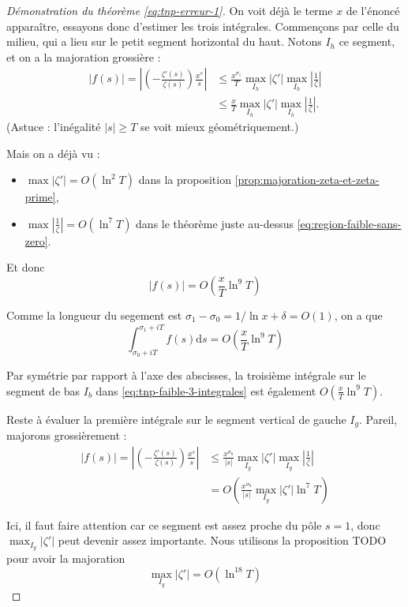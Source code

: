\documentclass[french]{report}
\begin{document}
\begin{proof}[Démonstration du théorème \ref{eq:tnp-erreur-1}]
  On voit déjà le terme $x$ de l'énoncé apparaître, essayons donc d'estimer les trois intégrales. Commençons par celle du milieu, qui a lieu sur le petit segment horizontal du haut. Notons $I_h$ ce segment, et on a la majoration grossière :
  \begin{align*}
    |f(s)| = \left|\left(-\frac{\zeta'(s)}{\zeta(s)}\right)\frac{x^s}{s}\right| & \leq\frac{x^{\sigma_1}}{T}\max_{I_h}|\zeta'|\max_{I_h}\left|\frac{1}{\zeta}\right| \\
    & \leq\frac{x}{T}\max_{I_h}|\zeta'|\max_{I_h}\left|\frac{1}{\zeta}\right|.
  \end{align*}
  (Astuce : l'inégalité $|s|\geq T$ se voit mieux géométriquement.)

  Mais on a déjà vu :
  \begin{itemize}
    \item $\max|\zeta'| = O(\ln^2 T)$ dans la proposition \ref{prop:majoration-zeta-et-zeta-prime},
    \item $\max|\frac{1}{\zeta}| = O(\ln^7 T)$ dans le théorème juste au-dessus \ref{eq:region-faible-sans-zero}.
  \end{itemize}

  Et donc
  \[ |f(s)| = O\left(\frac{x}{T}\ln^9T\right) \]

  Comme la longueur du segement est $\sigma_1-\sigma_0=1/\ln x+\delta=O(1)$, on a que
  \begin{equation}\label{eq:tnp-faible-3-integrales-part1}
    \int_{\sigma_0+iT}^{\sigma_1+iT}f(s)\mathrm{d}s = O\left(\frac{x}{T}\ln^9T\right)
  \end{equation}

  Par symétrie par rapport à l'axe des abscisses, la troisième intégrale sur le segment de bas $I_b$ dans \ref{eq:tnp-faible-3-integrales} est également $O\left(\frac{x}{T}\ln^9T\right)$.

  Reste à évaluer la première intégrale sur le segment vertical de gauche $I_g$. Pareil, majorons grossièrement :
  \begin{align*}
    |f(s)| = \left|\left(-\frac{\zeta'(s)}{\zeta(s)}\right)\frac{x^s}{s}\right| & \leq\frac{x^{\sigma_0}}{|s|}\max_{I_g}|\zeta'|\max_{I_g}\left|\frac{1}{\zeta}\right| \\
    & = O\left(\frac{x^{\sigma_0}}{|s|}\max_{I_g}|\zeta'|\ln^7 T\right)
  \end{align*}

  Ici, il faut faire attention car ce segment est assez proche du pôle $s=1$, donc $\max_{I_g}|\zeta'|$ peut devenir assez importante. Nous utilisons la proposition TODO pour avoir la majoration
  \begin{equation}\label{eq:tnp-faible-3-integrales-part2}
    \max_{I_g}|\zeta'|=O(\ln^{18}T)
  \end{equation}


\end{proof}
\end{document}
